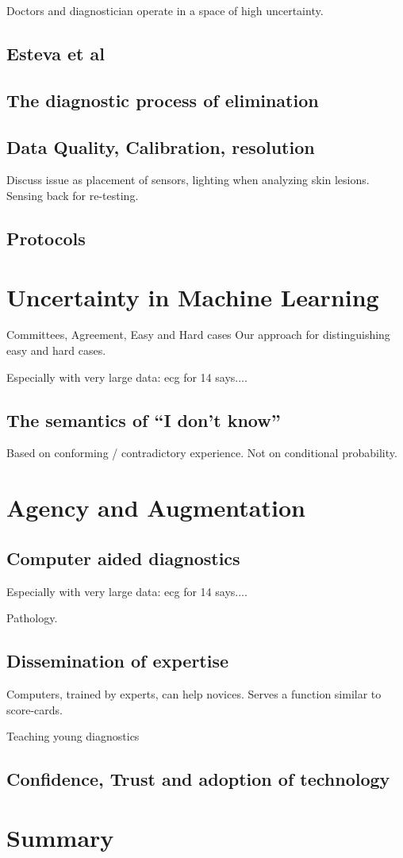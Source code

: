 \documentclass[fleqn,10pt]{wlscirep}
\begin{document}
Doctors and diagnostician operate in a space of high uncertainty.

\subsection*{Esteva et al}
\subsection*{The diagnostic process of elimination}
\subsection*{Data Quality, Calibration, resolution}
Discuss issue as placement of sensors, lighting when analyzing skin
lesions. Sensing back for re-testing.
\subsection*{Protocols}

\section*{Uncertainty in Machine Learning}
Committees, Agreement, Easy and Hard cases
Our approach for distinguishing easy and hard cases.

Especially with very large data: ecg for 14 says....

\subsection*{The semantics of ``I don't know''}
Based on conforming / contradictory experience. Not on conditional
probability.


\section*{Agency and Augmentation}
\subsection*{Computer aided diagnostics}
Especially with very large data: ecg for 14 says....

Pathology.

\subsection*{Dissemination of expertise}
Computers, trained by experts, can help novices.  Serves a function
similar to score-cards.

Teaching young diagnostics
\subsection*{Confidence, Trust and adoption of technology}

\section*{Summary}

 


\end{document}
